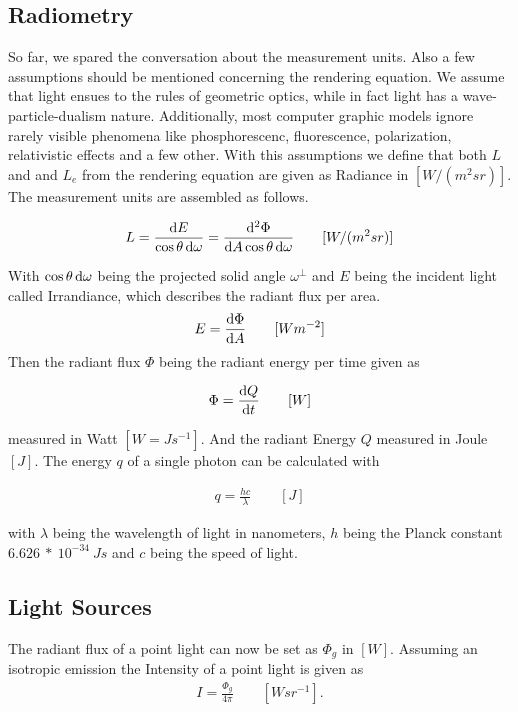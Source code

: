 \subsection{Radiometry}


So far, we spared the conversation about the measurement units. Also a few assumptions should be mentioned concerning the rendering equation. We assume that light ensues to the rules of geometric optics, while in fact light has a wave-particle-dualism nature. Additionally, most computer graphic models ignore rarely visible phenomena like phosphorescenc, fluorescence, polarization, relativistic effects and a few other. With this assumptions we define that both $L$ and and $L_e$ from the rendering equation are given as Radiance in $[W / (m^2sr)]$. The measurement units are assembled as follows.

\begin{align}
L = \frac{\mathop{}\!\mathrm{d} E}{\cos \theta \mathop{}\!\mathrm{d}\omega} = \frac{\mathop{}\!\mathrm{d}^2\Phi}{\mathop{}\!\mathrm{d} A\cos \theta \mathop{}\!\mathrm{d}\omega} \qquad [W / (m^2 sr) ]
\end{align}


With $\cos \theta \mathop{}\!\mathrm{d}\omega$ being the projected solid angle $\omega^\perp$ and $E$ being the incident light called Irrandiance, which describes the radiant flux per area.
\begin{align}
E = \frac{ \mathop{}\!\mathrm{d} \Phi }{ \mathop{}\!\mathrm{d} A } \qquad [W m^{-2} ]
\end{align}
Then the radiant flux $\Phi$ being the radiant energy per time given as

\begin{align}
 \Phi = \frac{\mathop{}\!\mathrm{d} Q}{\mathop{}\!\mathrm{d} t} \qquad [W]   
\end{align}

measured in Watt $[W = Js^{-1} ]$. And the radiant Energy $Q$ measured in Joule $[J]$. The energy $q$ of a single photon can be calculated with 

\begin{align}
 q = \frac{hc}{\lambda} \qquad [J]   
\end{align}

with $\lambda$ being the wavelength of light in nanometers, $h$ being the Planck constant $6.626~*~10^{-34}~Js$ and $c$ being the speed of light.

\subsection{Light Sources}


The radiant flux of a point light can now be set as $\Phi_g$ in $[W]$. Assuming an isotropic emission the Intensity of a point light is given as
\begin{align}
 I = \frac{\Phi_g}{4\pi} \qquad [ W sr^{-1} ] .
\end{align}

